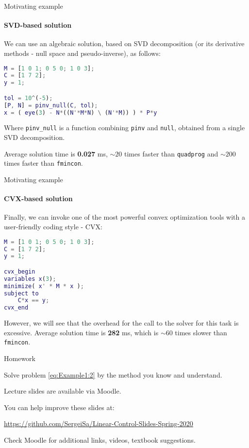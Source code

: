 \documentclass{beamer}
\begin{document}
\begin{frame}[fragile]{Motivating example}
\framesubtitle{SVD-based solution}
\begin{flushleft}

We can use an algebraic solution, based on SVD decomposition (or its derivative methods - null space and pseudo-inverse), as follows:

\begin{lstlisting}[language=Matlab]
M = [1 0 1; 0 5 0; 1 0 3]; 
C = [1 7 2]; 
y = 1;

tol = 10^(-5);
[P, N] = pinv_null(C, tol);
x = ( eye(3) - N*((N'*M*N) \ (N'*M)) ) * P*y
\end{lstlisting}

Where \texttt{pinv\_null} is a function combining \texttt{pinv} and \texttt{null}, obtained from a single SVD decomposition.

Average solution time is \textbf{0.027} ms, $\sim 20$ times faster than \texttt{quadprog} and $\sim 200$ times faster than \texttt{fmincon}.

\end{flushleft}
\end{frame}



\begin{frame}[fragile]{Motivating example}
\framesubtitle{CVX-based solution}
\begin{flushleft}

Finally, we can invoke one of the most powerful convex optimization tools with a user-friendly coding style - CVX:

\begin{lstlisting}[language=Matlab]
M = [1 0 1; 0 5 0; 1 0 3];
C = [1 7 2];
y = 1;

cvx_begin
variables x(3);
minimize( x' * M * x );
subject to
    C*x == y;
cvx_end
\end{lstlisting}

However, we will see that the overhead for the call to the solver for this task is excessive. Average solution time is \textbf{282} ms, which is $\sim 60$ times slower than \texttt{fmincon}.

\end{flushleft}
\end{frame}




\begin{frame}{Homework}
\begin{flushleft}

Solve problem \eqref{eq:Example1:2} by the method you know and understand.

\end{flushleft}
\end{frame}




\begin{frame}
\centerline{Lecture slides are available via Moodle.}
\bigskip
\centerline{You can help improve these slides at:}
\centerline{\url{https://github.com/SergeiSa/Linear-Control-Slides-Spring-2020}}
\bigskip
\centerline{Check Moodle for additional links, videos, textbook suggestions.}
\end{frame}
\end{document}
